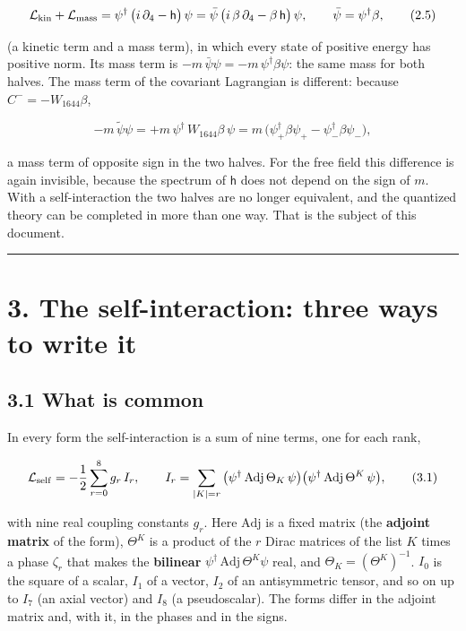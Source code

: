 \documentclass[
  10pt,
]{article}
\begin{document}
\[\mathcal L_{\rm kin}+\mathcal L_{\rm mass}=\psi^\dagger\,\big(i\,\partial_4-\mathsf h\big)\,\psi
=\bar\psi\,\big(i\,\beta\,\partial_4-\beta\,\mathsf h\big)\,\psi,\qquad\bar\psi=\psi^\dagger\beta,\tag{2.5}\]

(a kinetic term and a mass term), in which every state of positive
energy has positive norm. Its mass term is
\(-m\,\bar\psi\psi=-m\,\psi^\dagger\beta\psi\): the same mass for both
halves. The mass term of the covariant Lagrangian is different: because
\(C^-=-W_{1644}\beta\),

\[-m\,\tilde\psi\psi=+m\,\psi^\dagger\,W_{1644}\beta\,\psi=m\,\big(\psi_+^\dagger\beta\psi_+-\psi_-^\dagger\beta\psi_-\big),\tag{2.6}\]

a mass term of opposite sign in the two halves. For the free field this
difference is again invisible, because the spectrum of \(\mathsf h\)
does not depend on the sign of \(m\). With a self-interaction the two
halves are no longer equivalent, and the quantized theory can be
completed in more than one way. That is the subject of this document.

\begin{center}\rule{0.5\linewidth}{0.5pt}\end{center}

\hypertarget{the-self-interaction-three-ways-to-write-it}{%
\section{3. The self-interaction: three ways to write
it}\label{the-self-interaction-three-ways-to-write-it}}

\hypertarget{what-is-common}{%
\subsection{3.1 What is common}\label{what-is-common}}

In every form the self-interaction is a sum of nine terms, one for each
rank,

\[\mathcal L_{\rm self}=-\frac12\sum_{r=0}^{8}g_r\,I_r,\qquad
I_r=\sum_{|K|=r}\big(\psi^\dagger\,\mathrm{Adj}\,\Theta_K\,\psi\big)\big(\psi^\dagger\,\mathrm{Adj}\,\Theta^K\,\psi\big),\tag{3.1}\]

with nine real coupling constants \(g_r\). Here \(\mathrm{Adj}\) is a
fixed matrix (the \textbf{adjoint matrix} of the form), \(\Theta^K\) is
a product of the \(r\) Dirac matrices of the list \(K\) times a phase
\(\zeta_r\) that makes the \textbf{bilinear}
\(\psi^\dagger\,\mathrm{Adj}\,\Theta^K\psi\) real, and
\(\Theta_K=(\Theta^K)^{-1}\). \(I_0\) is the square of a scalar, \(I_1\)
of a vector, \(I_2\) of an antisymmetric tensor, and so on up to \(I_7\)
(an axial vector) and \(I_8\) (a pseudoscalar). The forms differ in the
adjoint matrix and, with it, in the phases and in the signs.
\end{document}
